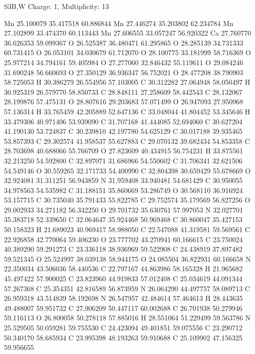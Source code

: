 \documentclass{article}
\begin{document}
S3B,W   Charge: 1, Multiplicity: 13     
    
Mn 25.100079 35.417518 60.886844 
Mn 27.446274 35.203802 62.234784 
Mn 27.102899 33.474370 60.113443 
Mn 27.606555 33.057247 56.920322 
Ca 27.760770 36.626353 59.099367 
O 26.525387 36.480471 61.295865 
O 28.285139 34.731333 60.731415 
O 26.053101 34.030679 61.712070 
O 28.100775 33.181999 58.716369 
O 25.977214 34.794161 59.405984 
O 27.277060 32.846432 55.119611 
O 29.084246 31.690248 56.660693 
O 27.350129 36.936347 56.752021 
O 28.477208 38.790903 58.725053 
H 30.386279 26.554956 57.103005 
C 30.312282 27.064948 58.050497 
H 30.925319 26.579770 58.850733 
C 28.848111 27.258609 58.442543 
C 28.132067 28.199876 57.475131 
O 28.807616 29.203683 57.071499 
O 26.947093 27.950968 57.136314 
H 33.765459 42.205889 52.647136 
C 33.048044 41.804452 53.345646 
H 33.479306 40.971406 53.939090 
C 31.707168 41.444085 52.694060 
C 30.627204 41.190130 53.724837 
C 30.239810 42.197780 54.625129 
C 30.017188 39.935465 53.857393 
C 29.302574 41.958537 55.627883 
C 29.070132 39.682434 54.853358 
C 28.703698 40.688066 55.766709 
O 27.823609 40.434915 56.754231 
H 33.875561 32.213250 54.592800 
C 32.897071 31.686966 54.550602 
C 31.706341 32.621506 54.549146 
O 30.559265 32.171733 54.400990 
C 32.804398 30.659429 55.678669 
O 32.924081 31.311251 56.943859 
N 31.959408 33.940481 54.681429 
C 30.950055 34.978563 54.535982 
C 31.188151 35.860669 53.286749 
O 30.568110 36.916924 53.157715 
C 30.735040 35.791433 55.822785 
C 29.752574 35.179569 56.827256 
O 29.002933 34.271182 56.342250 
O 29.701732 35.630761 57.997053 
N 32.027701 35.383718 52.339650 
C 32.064647 35.924468 50.969468 
C 30.860047 35.427153 50.158323 
H 21.689023 40.969417 58.988050 
C 22.547088 41.319581 59.569561 
C 22.926858 42.770064 59.406230 
O 23.777702 43.270941 60.166615 
C 23.750024 40.389290 59.291273 
C 23.336118 38.936969 59.522908 
C 24.438919 37.897482 59.521345 
O 25.524997 38.039138 58.944175 
O 24.085504 36.822931 60.166658 
N 22.350034 43.506036 58.440536 
C 22.797167 44.863986 58.165328 
H 21.965682 45.497422 57.900025 
C 23.823960 44.919833 57.012408 
C 25.034619 44.091344 57.267368 
C 25.354351 42.816589 56.873959 
N 26.064290 44.497757 58.089713 
C 26.959318 43.514839 58.192698 
N 26.547957 42.484614 57.464613 
H 28.443635 49.488007 59.951732 
C 27.906209 50.447117 60.002688 
C 26.701938 50.279946 59.116113 
O 26.800058 50.278118 57.885016 
H 28.551064 51.229499 59.563786 
N 25.529505 50.059281 59.755530 
C 24.423094 49.401851 59.075556 
C 23.290712 50.340170 58.685934 
C 23.995398 48.193263 59.910688 
C 25.109902 47.156325 59.956655 
\end{document}
